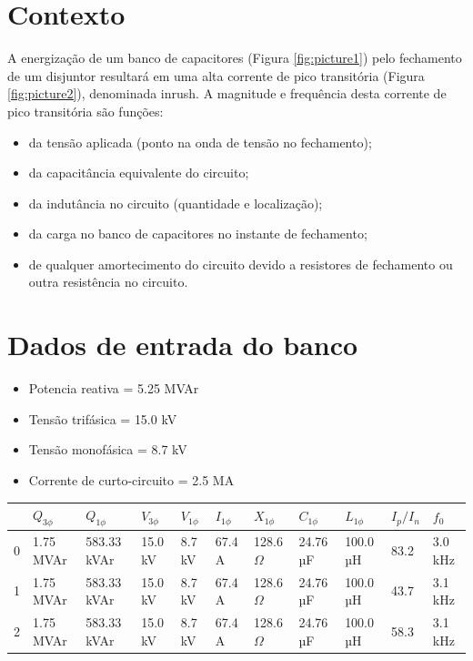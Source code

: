 \documentclass[a4paper]{article}
\begin{document}

\section{Contexto}
A energização de um banco de capacitores (Figura \ref{fig:picture1}) pelo fechamento de um disjuntor resultará em uma alta corrente de pico transitória (Figura \ref{fig:picture2}), denominada inrush. A magnitude e frequência desta corrente de pico transitória são funções:
\begin{itemize}[label=\textendash]
\item	da tensão aplicada (ponto na onda de tensão no fechamento);
\item	da capacitância equivalente do circuito;
\item	da indutância no circuito (quantidade e localização);
\item	da carga no banco de capacitores no instante de fechamento;
\item	de qualquer amortecimento do circuito devido a resistores de fechamento ou outra resistência no circuito.
\end{itemize}
	
\section{Dados de entrada do banco}
\begin{itemize}[label=\textendash]
	\item	Potencia reativa  = {{5.25 MVAr}}
	\item	Tensão trifásica  = {{15.0 kV}}
	\item	Tensão monofásica  = {{8.7 kV}}
	\item	Corrente de curto-circuito  = {{2.5 MA}}
\end{itemize}

\begin{center}
	\begin{tabular}{lllllllllll}
\toprule
 & $Q_{3\phi}$ & $Q_{1\phi}$ & $V_{3\phi}$ & $V_{1\phi}$ & $I_{1\phi}$ & $X_{1\phi}$ & $C_{1\phi}$ & $L_{1\phi}$ & $I_{p}/I_{n}$ & $f_{0}$ \\
\midrule
0 & 1.75 MVAr & 583.33 kVAr & 15.0 kV & 8.7 kV & 67.4 A & 128.6 $\Omega$ & 24.76 µF & 100.0 µH & 83.2 & 3.0 kHz \\
1 & 1.75 MVAr & 583.33 kVAr & 15.0 kV & 8.7 kV & 67.4 A & 128.6 $\Omega$ & 24.76 µF & 100.0 µH & 43.7 & 3.1 kHz \\
2 & 1.75 MVAr & 583.33 kVAr & 15.0 kV & 8.7 kV & 67.4 A & 128.6 $\Omega$ & 24.76 µF & 100.0 µH & 58.3 & 3.1 kHz \\
\bottomrule
\end{tabular}

\end{center}
\end{document}
